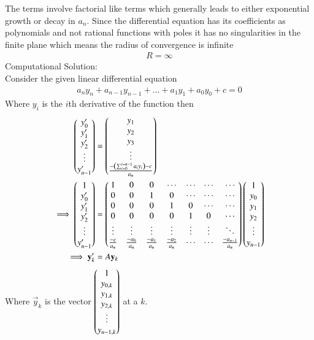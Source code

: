 \documentclass[journal]{IEEEtran}
\begin{document}
The terms involve factorial like terms which generally leads to either exponential growth or decay in $a_n$. Since the differential equation has its coefficients as polynomials and not rational functions with poles it has no singularities in the finite plane which means the radius of convergence is infinite
\begin{align}
    R=\infty
\end{align}
Computational Solution:\\
Consider the given linear differential equation
\begin{align}
	a_{n}y_{n} + a_{n-1}y_{n-1} + \dots + a_{1}y_1 + a_{0}y_{0} + c = 0
\end{align}
Where $y_{i}$ is the $i$th derivative of the function then
\begin{align}
    \begin{pmatrix}y_{0}^{\prime}\\y_{1}^{\prime}\\y_{2}^{\prime}\\ \vdots\\y^{\prime}_{n-1}\end{pmatrix}&=\begin{pmatrix}y_{1}\\y_{2}\\y_{3}\\ \vdots\\ \frac{-\left(\sum_{i=0}^{i=n-1}a_iy_i\right)-c}{a_n}\end{pmatrix}\\
    \implies  \begin{pmatrix}1\\y_{0}^{\prime}\\y_{1}^{\prime}\\y_{2}^{\prime}\\ \vdots\\y^{\prime}_{n-1}\end{pmatrix}&=\begin{pmatrix}1&0&0&\cdots&\cdots&\cdots&\cdots\\0&0&1&0&\cdots&\cdots&\cdots\\0&0&0&1&0&\cdots&\cdots\\0&0&0&0&1&0&\cdots\\ \vdots&\vdots&\vdots&\vdots&\vdots&\vdots&\ddots\\ \frac{-c}{a_n}&\frac{-a_{0}}{a_n}&\frac{-a_{1}}{a_n}&\frac{-a_{2}}{a_n}&\cdots&\cdots&\frac{-a_{n-1}}{a_n}\end{pmatrix}\begin{pmatrix}1\\y_{0}\\y_{1}\\y_{2}\\ \vdots\\y_{n-1}\end{pmatrix}\\
    \implies \mathbf{y}_k^{\prime}&=A\mathbf{y}_k
\end{align}
Where $\vec{y}_k$ is the vector $\begin{pmatrix}1\\y_{0,k}\\y_{1,k}\\y_{2,k}\\ \vdots\\y_{n-1,k}\end{pmatrix}$ at a $k$.
\end{document}
